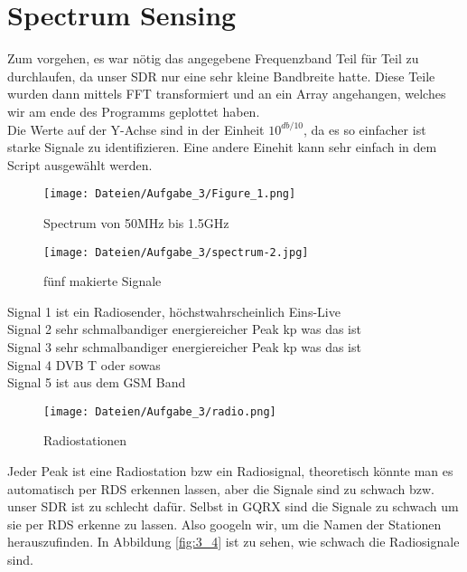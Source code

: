 \documentclass[12pt,a4paper]{article}
\begin{document}
\section{Spectrum Sensing}
Zum vorgehen, es war nötig das angegebene Frequenzband Teil für Teil zu durchlaufen, da unser SDR nur eine sehr kleine Bandbreite hatte. Diese Teile wurden dann mittels FFT transformiert und an ein Array angehangen, welches wir am ende des Programms geplottet haben.\\
Die Werte auf der Y-Achse sind in der Einheit $10^{db/10}$, da es so einfacher ist starke Signale zu identifizieren. Eine andere Einehit kann sehr einfach in dem Script ausgewählt werden.
\begin{figure}[H]
\centering
\texttt{[image: Dateien/Aufgabe\_3/Figure\_1.png]} 
\caption{Spectrum von 50MHz bis 1.5GHz}
\label{fig:3_1}
\end{figure}
\begin{figure}[H]
\centering
\texttt{[image: Dateien/Aufgabe\_3/spectrum-2.jpg]} 
\caption{fünf makierte Signale}
\label{fig:3_1_1}
\end{figure}
Signal 1 ist ein Radiosender, höchstwahrscheinlich Eins-Live \\
Signal 2 sehr schmalbandiger energiereicher Peak kp was das ist\\
Signal 3 sehr schmalbandiger energiereicher Peak kp was das ist\\
Signal 4 DVB T oder sowas \\
Signal 5 ist aus dem GSM Band\\
\begin{figure}[H]
\centering
\texttt{[image: Dateien/Aufgabe\_3/radio.png]} 
\caption{Radiostationen}
\label{fig:3_2}
\end{figure}
Jeder Peak ist eine Radiostation bzw ein Radiosignal, theoretisch könnte man es automatisch per RDS erkennen lassen, aber die Signale sind zu schwach bzw. unser SDR ist zu schlecht dafür. Selbst in GQRX sind die Signale zu schwach um sie per RDS erkenne zu lassen. Also googeln wir, um die Namen der Stationen herauszufinden. In Abbildung \ref{fig:3_4} ist zu sehen, wie schwach die Radiosignale sind.
\end{document}
